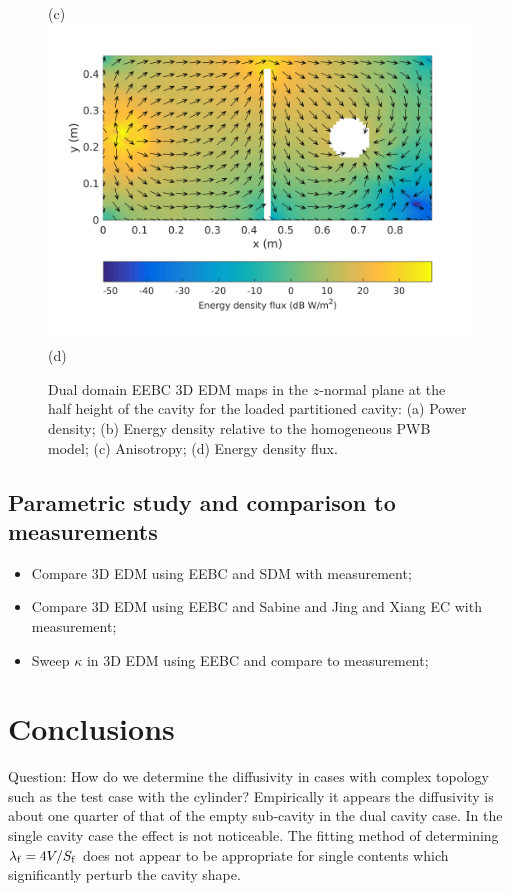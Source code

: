 \documentclass[a4paper]{article}
\numberwithin{equation}{section}
\begin{document}
\begin{figure}[ht]
\begin{center}
{\footnotesize (c)}\\
\vspace{2mm}
\includegraphics[trim={0 13mm 0 12mm},clip,width=0.53\linewidth]{figures/DDM-EEBC_3D_DL_EnergyDensityFluxMap}\\
{\footnotesize (d)}\\
\vspace{-2mm}
\caption{\label{fg:partcylsdm_maps} Dual domain EEBC 3D EDM maps in the $z$-normal plane at the half height of the cavity for the 
loaded partitioned cavity: (a) Power density; (b) Energy density relative to the homogeneous PWB model;
(c) Anisotropy; (d) Energy density flux.}
\end{center}
\end{figure}

\subsection[Parametric study and comparison to measurements]{Parametric study and comparison to measurements}
\label{sc:res:para}

\begin{itemize}
 \item Compare 3D EDM using EEBC and SDM with measurement;
 \item Compare 3D EDM using EEBC and Sabine and Jing and Xiang EC with measurement;
 \item Sweep $\kappa$ in 3D EDM using EEBC and compare to measurement; 
\end{itemize}

\section[Conclusions]{Conclusions}
\label{sc:conc}

{\color{red} Question: How do we determine the diffusivity in cases with complex topology such as
the test case with the cylinder? Empirically it appears the diffusivity is about one quarter of that
of the empty sub-cavity in the dual cavity case. In the single cavity case the effect is not
noticeable. The fitting method of determining $\lambda_{\mathrm{f}} = 4V/S_{\mathrm{f}}$ does not appear to be
appropriate for single contents which significantly perturb the cavity shape.}


%

\end{document}
